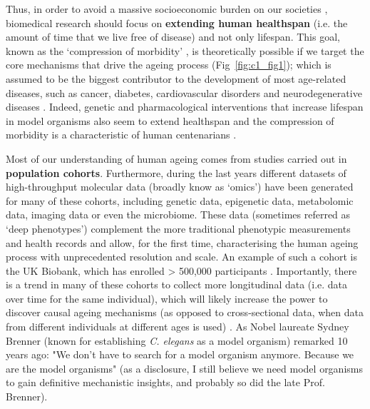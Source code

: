 Thus, in order to avoid a massive socioeconomic burden on our societies \citep{Fine2014}, biomedical research should focus on \textbf{extending human healthspan} (i.e. the amount of time that we live free of disease) and not only lifespan. This goal, known as the `compression of morbidity' \citep{Partridge2018}, is theoretically possible if we target the core mechanisms that drive the ageing process (Fig~\ref{fig:c1_fig1}); which is assumed to be the biggest contributor to the development of most age-related diseases, such as cancer, diabetes, cardiovascular disorders and neurodegenerative diseases \citep{Lopez-Otin2013}. Indeed, genetic and pharmacological interventions that increase lifespan in model organisms also seem to extend healthspan \citep{NewellStamper2018} and the compression of morbidity is a characteristic of human centenarians \citep{Feldman2012}.  

\bigskip

Most of our understanding of human ageing comes from studies carried out in \textbf{population cohorts}. Furthermore, during the last years different datasets of high-throughput molecular data (broadly know as `omics') have been generated for many of these cohorts, including genetic data, epigenetic data, metabolomic data, imaging data or even the microbiome. These data (sometimes referred as `deep phenotypes') complement the more traditional phenotypic measurements and health records and allow, for the first time, characterising the human ageing process with unprecedented resolution and scale. An example of such a cohort is the UK Biobank, which has enrolled > 500,000 participants \citep{Bahcall2018}. Importantly, there is a trend in many of these cohorts to collect more longitudinal data (i.e. data over time for the same individual), which will likely increase the power to discover causal ageing mechanisms (as opposed to cross-sectional data, when data from different individuals at different ages is used) \citep{Rahmadi2017}. As Nobel laureate Sydney Brenner (known for establishing \textit{C. elegans} as a model organism) remarked 10 years ago: "We don't have to search for a model organism anymore. Because we are the model organisms" \citep{FitzGerald2018} (as a disclosure, I still believe we need model organisms to gain definitive mechanistic insights, and probably so did the late Prof. Brenner). 

\bigskip

